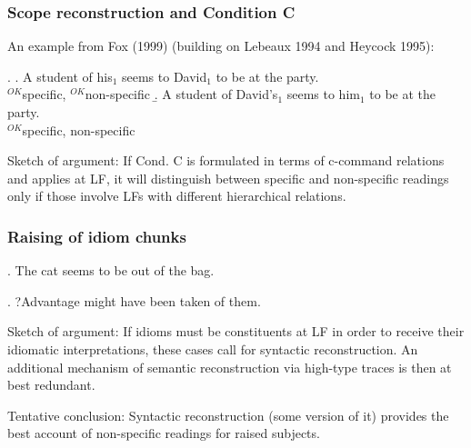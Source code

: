 \subsubsection{Scope reconstruction and Condition C}

An  %
example from Fox (1999) (building on Lebeaux 1994 and Heycock 1995):

\ex. \a. A student of his$_{1}$ seems to David$_1$ to be at the party.\\
\null\hfill $^{OK}$specific, $^{OK}$non-specific 
\b. A student of David's$_{1}$ seems to him$_{1}$ to be at the party.\\
\null\hfill $^{OK}$specific, {\small *}non-specific

Sketch of argument: If Cond. C is formulated in terms of c-command relations and applies at LF, it will distinguish between specific and non-specific readings only if those involve LFs with different hierarchical relations.

\enlargethispage{36pt}

\subsubsection{Raising of idiom chunks}

\ex. The cat seems to be out of the bag.

\ex. ?Advantage might have been taken of them.

Sketch of argument: If idioms must be constituents at LF in order to receive their idiomatic interpretations, these cases call for syntactic reconstruction. An additional mechanism of semantic reconstruction via high-type traces is then at best redundant.

\medskip\noindent Tentative conclusion: Syntactic reconstruction (some version of it) provides the best account of non-specific readings for raised subjects.



